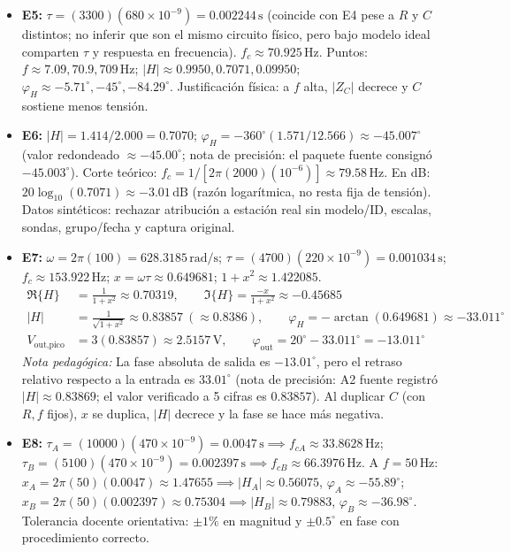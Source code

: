 \documentclass[11pt, a4paper]{article}
\begin{document}
\begin{itemize}
    \item \textbf{E5:} $\tau = (3300)(680\times 10^{-9}) = 0.002244\,\text{s}$ (coincide con E4 pese a $R$ y $C$ distintos; no inferir que son el mismo circuito físico, pero bajo modelo ideal comparten $\tau$ y respuesta en frecuencia). $f_c \approx 70.925\,\text{Hz}$. Puntos: $f \approx 7.09, 70.9, 709\,\text{Hz}$; $|H| \approx 0.9950, 0.7071, 0.09950$; $\varphi_H \approx -5.71^\circ, -45^\circ, -84.29^\circ$. Justificación física: a $f$ alta, $|Z_C|$ decrece y $C$ sostiene menos tensión.

    \item \textbf{E6:} $|H| = 1.414/2.000 = 0.7070$; $\varphi_H = -360^\circ(1.571/12.566) \approx -45.007^\circ$ (valor redondeado $\approx -45.00^\circ$; nota de precisión: el paquete fuente consignó $-45.003^\circ$). Corte teórico: $f_c = 1/[2\pi(2000)(10^{-6})] \approx 79.58\,\text{Hz}$. En dB: $20\log_{10}(0.7071) \approx -3.01\,\text{dB}$ (razón logarítmica, no resta fija de tensión). Datos sintéticos: rechazar atribución a estación real sin modelo/ID, escalas, sondas, grupo/fecha y captura original.

    \item \textbf{E7:} $\omega = 2\pi(100) = 628.3185\,\text{rad/s}$; $\tau = (4700)(220\times 10^{-9}) = 0.001034\,\text{s}$; $f_c \approx 153.922\,\text{Hz}$; $x = \omega\tau \approx 0.649681$; $1 + x^2 \approx 1.422085$.
    \begin{align*}
        \Re\{H\} &= \frac{1}{1+x^2} \approx 0.70319, \qquad \Im\{H\} = \frac{-x}{1+x^2} \approx -0.45685 \\
        |H| &= \frac{1}{\sqrt{1+x^2}} \approx 0.83857\ (\approx 0.8386), \qquad \varphi_H = -\arctan(0.649681) \approx -33.011^\circ \\
        V_{\text{out,pico}} &= 3(0.83857) \approx 2.5157\,\text{V}, \qquad \varphi_{\text{out}} = 20^\circ - 33.011^\circ = -13.011^\circ
    \end{align*}
    \textit{Nota pedagógica:} La fase absoluta de salida es $-13.01^\circ$, pero el retraso relativo respecto a la entrada es $33.01^\circ$ (nota de precisión: A2 fuente registró $|H|\approx 0.83869$; el valor verificado a 5 cifras es $0.83857$). Al duplicar $C$ (con $R, f$ fijos), $x$ se duplica, $|H|$ decrece y la fase se hace más negativa.

    \item \textbf{E8:} $\tau_A = (10000)(470\times 10^{-9}) = 0.0047\,\text{s} \implies f_{cA} \approx 33.8628\,\text{Hz}$; $\tau_B = (5100)(470\times 10^{-9}) = 0.002397\,\text{s} \implies f_{cB} \approx 66.3976\,\text{Hz}$. A $f = 50\,\text{Hz}$: $x_A = 2\pi(50)(0.0047) \approx 1.47655 \implies |H_A| \approx 0.56075$, $\varphi_A \approx -55.89^\circ$; $x_B = 2\pi(50)(0.002397) \approx 0.75304 \implies |H_B| \approx 0.79883$, $\varphi_B \approx -36.98^\circ$. Tolerancia docente orientativa: $\pm 1\%$ en magnitud y $\pm 0.5^\circ$ en fase con procedimiento correcto.
\end{itemize}
\end{document}
